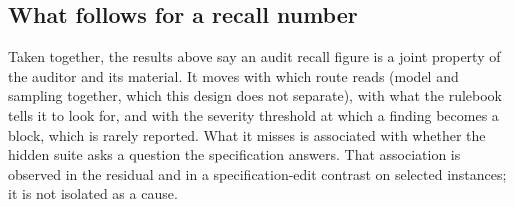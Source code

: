 \subsection{What follows for a recall number}

Taken together, the results above say an audit recall figure is a joint property of the auditor
and its material. It moves with which route reads (model and sampling together, which this design
does not separate), with what the rulebook tells it to look for, and with the severity threshold
at which a finding becomes a block, which is rarely reported. What it misses is associated with
whether the hidden suite asks a question the specification answers. That association is observed
in the residual and in a specification-edit contrast on selected instances; it is not isolated as a
cause.
